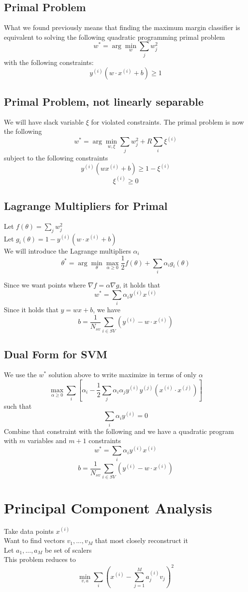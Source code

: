 \documentclass[twoside,11pt]{article}
\theoremstyle{definition}
\begin{document}
\newpage

\subsection{Primal Problem}

What we found previously means that finding the maximum margin classifier is equivalent to solving the following quadratic programming primal problem
\[
w^{*} = \arg \min_{w} \sum_j w_j^2
\]
with the following constraints:
\[
y^{(i)} ( w \cdot x^{(i)} + b) \geq 1
\]

\subsection{Primal Problem, not linearly separable}

We will have slack variable $\xi$ for violated constraints. The primal problem is now the following
\[
w^{*} = \arg \min_{w,\xi} \sum_j w_j^2 + R \sum_i \xi^{(i)}
\]
subject to the following constraints
\[
y^{(i)} (w x^{(i)} + b) \geq 1 - \xi^{(i)}
\]
\[
\xi^{(i)} \geq 0
\]

\subsection{Lagrange Multipliers for Primal}

Let $f(\theta) = \sum_j {w_j^2}$\\
Let $g_i(\theta) = 1-y^{(i)}(w \cdot x^{(i)} + b)$\\
We will introduce the Lagrange multipliers $\alpha_i$\\
\[
\theta^* = \arg \min_{\theta} \max_{\alpha \geq 0} \frac{1}{2} f(\theta) + \sum_i \alpha_i g_i(\theta)
\]

Since we want points where $\nabla f = \alpha \nabla g$, it holds that 
\[
w^* = \sum_i \alpha_i y^{(i)} x^{(i)}
\]
Since it holds that $y=wx+b$, we have
\[
b = \frac{1}{N_{sv}} \sum_{i \in SV} (y^{(i)} - w \cdot x^{(i)})
\]

\subsection{Dual Form for SVM}

We use the $w^*$ solution above to write maximize in terms of only $\alpha$ 
\[
\max_{\alpha \geq 0} \sum_i [\alpha_i - \frac{1}{2} \sum_j \alpha_i \alpha_j y^{(i)} y^{(j)} (x^{(i)} \cdot x^{(j)})]
\]
such that
\[
\sum_i \alpha_i y^{(i)} = 0
\]
Combine that constraint with the following and we have a quadratic program with $m$ variables and $m+1$ constraints 
\[
w^* = \sum_i \alpha_i y^{(i)} x^{(i)}
\]
\[
b = \frac{1}{N_{sv}} \sum_{i \in SV} (y^{(i)} - w \cdot x^{(i)})
\]

\newpage

\section{Principal Component Analysis}

Take data points $x^{(i)}$\\
Want to find vectors $v_1,...,v_M$ that most closely reconstruct it\\
Let $a_1,...,a_M$ be set of scalers\\
This problem reduces to
\[
\min_{v,a} \sum_{i} (x^{(i)} - \sum_{j=1}^M a_j^{(i)}v_j)^2
\]
\end{document}
